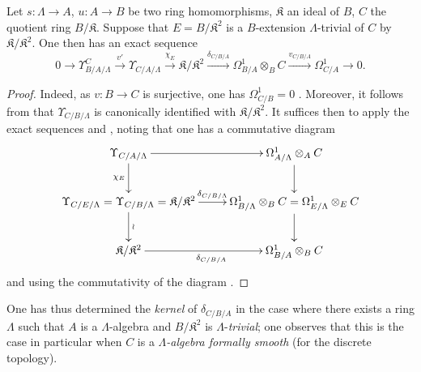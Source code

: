 \begin{proposition}[20.6.22]
\label{0.20.6.22}
Let $s:\Lambda\to A$, $u:A\to B$ be two ring homomorphisms, $\mathfrak{K}$ an ideal of $B$, $C$ the quotient ring $B/\mathfrak{K}$.
Suppose that $E=B/\mathfrak{K}^2$ is a $B$-extension $\Lambda$-trivial of $C$ by $\mathfrak{K}/\mathfrak{K}^2$.
One then has an exact sequence
\begin{equation}
\tag{20.6.22.1}
  \label{0.20.6.22.1}
  0\to\Upsilon^C_{B/A/\Lambda}\xrightarrow{v'}\Upsilon_{C/A/\Lambda}\xrightarrow{\chi_E}\mathfrak{K}/\mathfrak{K}^2\xrightarrow{\delta_{C/B/A}}\Omega^1_{B/A}\otimes_B C\xrightarrow{v_{C/B/A}}\Omega^1_{C/A}\to 0.
\end{equation}
\end{proposition}

\begin{proof}
Indeed, as $v:B\to C$ is surjective, one has $\Omega^1_{C/B}=0$ .
Moreover, it follows from  that $\Upsilon_{C/B/\Lambda}$ is canonically identified with $\mathfrak{K}/\mathfrak{K}^2$.
It suffices then to apply the exact sequences  and , noting that one has a commutative diagram
\[
\xymatrix{
  \Upsilon_{C/A/\Lambda} \ar[r] \ar[d]_{\chi_E} & \Omega^1_{A/\Lambda}\otimes_A C \ar[d] \\
  \Upsilon_{C/E/\Lambda}=\Upsilon_{C/B/\Lambda}=\mathfrak{K}/\mathfrak{K}^2 \ar[r]^-{\delta_{C/B/\Lambda}} \ar[d]^{\wr} & \Omega^1_{B/\Lambda}\otimes_B C=\Omega^1_{E/\Lambda}\otimes_E C \ar[d] \\
  \mathfrak{K}/\mathfrak{K}^2 \ar[r]_{\delta_{C/B/A}} & \Omega^1_{B/A}\otimes_B C
}
\]
and using the commutativity of the diagram .
\end{proof}

One has thus determined the \emph{kernel} of $\delta_{C/B/A}$ in the case where there exists a ring $\Lambda$ such that $A$ is a $\Lambda$-algebra and $B/\mathfrak{K}^2$ is $\Lambda$-\emph{trivial}; one observes that this is the case in particular when $C$ is a \emph{$\Lambda$-algebra formally smooth} (for the discrete topology).


